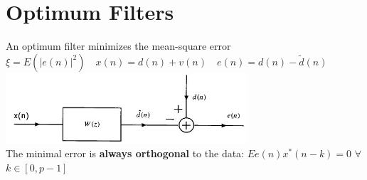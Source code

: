 \section{Optimum Filters}
An optimum filter minimizes the mean-square error $\xi = E\left(|e(n)|^2\right) \quad x(n)=d(n)+v(n) \quad e(n) = d(n) - \tilde{d}(n)$\\
\includegraphics[width=9cm]{../TSM_StatDig/bilder/optimumFilter.jpg}\\
The minimal error is \textbf{always orthogonal} to the data: $E{e(n)x^*(n-k)}=0$ $\forall$ $k\in[0,p-1]$

